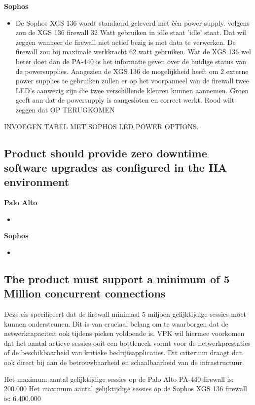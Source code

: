 \textbf{Sophos}
\begin{itemize}[label=\textbullet]
    \item De Sophos XGS 136 wordt standaard geleverd met één power supply. volgens \textcite{AccessNetworks2025} zou de XGS 136 firewall 32 Watt gebruiken in idle staat 'idle' staat. Dat wil zeggen wanneer de firewall niet actief bezig is met data te verwerken. De firewall zou bij maximale werkkracht 62 watt gebruiken. 
    Wat de XGS 136 wel beter doet dan de PA-440 is het informatie geven over de huidige status van de powersupplies. Aangezien de XGS 136 de mogelijkheid heeft om 2 externe power supplies te gebruiken zullen er op het voorpanneel van de firewall twee LED's aanwezig zijn die twee verschillende kleuren kunnen aannemen. Groen geeft aan dat de powersupply is aangesloten en correct werkt. Rood wilt zeggen dat OP TERUGKOMEN
\end{itemize}


INVOEGEN TABEL MET SOPHOS LED POWER OPTIONS.


\subsection{Product should provide zero downtime software upgrades as configured in the HA environment}
\textbf{Palo Alto}
\begin{itemize}[label=\textbullet]
    \item 
\end{itemize}

\textbf{Sophos}
\begin{itemize}[label=\textbullet]
    \item 
\end{itemize}


\subsection{The product must support a minimum of 5 Million concurrent connections}
Deze eis specificeert dat de firewall minimaal 5 miljoen gelijktijdige sessies moet kunnen ondersteunen. Dit is van cruciaal belang om te waarborgen dat de netwerkcapaciteit ook tijdens pieken voldoende is. VPK wil hiermee voorkomen dat het aantal actieve sessies ooit een bottleneck vormt voor de netwerkprestaties of de beschikbaarheid van kritieke bedrijfsapplicaties. Dit criterium draagt dan ook direct bij aan de betrouwbaarheid en schaalbaarheid van de infrastructuur.

Het maximum aantal gelijktijdige sessies op de Palo Alto PA-440 firewall is: 200.000 \newline
Het maximum aantal gelijktijdige sessies op de Sophos XGS 136 firewall is: 6.400.000

